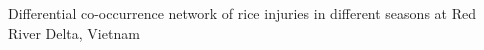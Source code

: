 Differential co-occurrence network of rice injuries in different seasons at Red River Delta, Vietnam
\label{fig:difseasonRR}